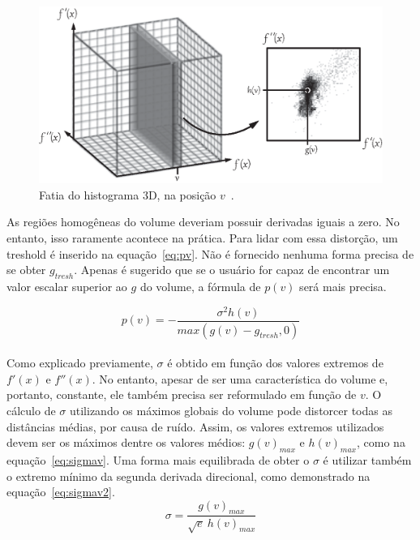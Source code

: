 \begin{figure}[h]
	\centering
	\includegraphics[width=1\textwidth]{images/g_hv}
	\caption{Fatia do histograma 3D, na posição $ v $~\cite{gordonms}.}
	\label{fig:g_hv}
\end{figure}

	As regiões homogêneas do volume deveriam possuir derivadas iguais a zero. No entanto, isso raramente acontece na prática. Para lidar com essa distorção, um treshold é inserido na equação~\eqref{eq:pv}. Não é fornecido nenhuma forma precisa de se obter $ g_{tresh} $. Apenas é sugerido que se o usuário for capaz de encontrar um valor escalar superior ao $ g $ do volume, a fórmula de $ p(v) $ será mais precisa.

\begin{equation} \label{eq:pv}
	p(v) = -\frac{\sigma^{2}h(v)}{max(g(v) - g_{tresh}, 0)}
\end{equation} \\

	Como explicado previamente, $\sigma$ é obtido em função dos valores extremos de $f'(x)$ e $f''(x)$. No entanto, apesar de ser uma característica do volume e, portanto, constante, ele também precisa ser reformulado em função de $v$. O cálculo de $\sigma$ utilizando os máximos globais do volume pode distorcer todas as distâncias médias, por causa de ruído. Assim, os valores extremos utilizados devem ser os máximos dentre os valores médios: $g(v)_{max}$ e $h(v)_{max}$, como na equação~\eqref{eq:sigmav}. Uma forma mais equilibrada de obter o $\sigma$ é utilizar também o extremo mínimo da segunda derivada direcional, como demonstrado na equação~\eqref{eq:sigmav2}. \\
	
\begin{equation} \label{eq:sigmav}
	\sigma = \frac{g(v)_{max}}{\sqrt{e}\ h(v)_{max}}
\end{equation} \\

